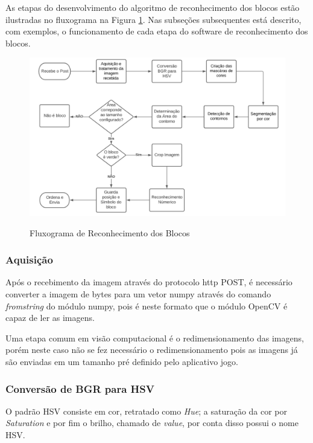     As etapas do desenvolvimento do algoritmo de reconhecimento dos blocos estão ilustradas no fluxograma na Figura \ref{figura:fluxo}. 
    Nas subseções subsequentes está descrito, com exemplos, o funcionamento de cada etapa do software de reconhecimento dos blocos.
    
    \begin{figure}[H]
        \caption{Fluxograma de Reconhecimento dos Blocos}
        \centering
        \includegraphics[width=\linewidth]{Imagens/Cap4/fluxo.PNG}
        \label{figura:fluxo}
    \end{figure}


    \subsubsection{Aquisição}
    
    Após o recebimento da imagem através do protocolo http POST, é necessário converter a imagem de bytes para um vetor numpy através do comando \textit{fromstring} do módulo numpy, pois é neste formato que o módulo OpenCV é capaz de ler as imagens. 
    
    Uma etapa comum em visão computacional é o redimensionamento  das imagens, porém neste caso não se fez necessário o redimensionamento pois as imagens já são enviadas em um tamanho pré definido pelo aplicativo jogo.

    \subsubsection{Conversão de BGR para HSV}
    O padrão HSV consiste em cor, retratado como \textit{Hue}; a saturação da cor por \textit{Saturation} e por fim o brilho, chamado de \textit{value}, por conta disso possui o nome HSV.
    
